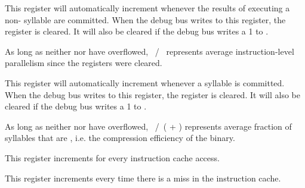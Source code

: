 This register will automatically increment whenever the results of executing a 
non- syllable are committed. When the debug bus writes to this 
register, the register is cleared. It will also be cleared if the debug bus 
writes a 1 to .

As long as neither  nor  have overflowed,
~/~ represents average instruction-level parallelism since
the registers were cleared.

\debugCanWrite{}


This register will automatically increment whenever a  syllable is 
committed. When the debug bus writes to this register, the register is cleared. 
It will also be cleared if the debug bus writes a 1 to .

As long as neither  nor  have overflowed,
~/~( + ) represents average fraction of syllables
that are , i.e. the compression efficiency of the binary.

\debugCanWrite{}


This register increments for every instruction cache access.

\debugCanWrite{}


This register increments every time there is a miss in the instruction cache.

\debugCanWrite{}


